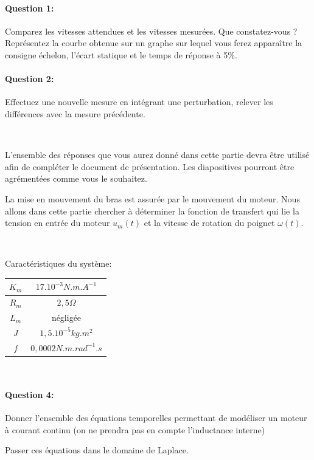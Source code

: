 \paragraph{Question 1:} Comparez les vitesses attendues et les vitesses mesurées. Que constatez-vous ? Représentez la courbe obtenue sur un graphe sur lequel vous ferez apparaître la consigne échelon, l'écart statique et le temps de réponse à 5\%.

\paragraph{Question 2:} Effectuez une nouvelle mesure en intégrant une perturbation, relever les différences avec la mesure précédente.

~\

L'ensemble des réponses que vous aurez donné dans cette partie devra être utilisé afin de compléter le document de présentation. Les diapositives pourront être agrémentées comme vous le souhaitez.

\ifdef{\public}{\cleardoublepage}{\newpage}


La mise en mouvement du bras est assurée par le mouvement du moteur. Nous allons dans cette partie chercher à déterminer la fonction de transfert qui lie la tension en entrée du moteur $u_m(t)$ et la vitesse de rotation du poignet $\omega(t)$.

~\

Caractéristiques du système:
\begin{tabular}{|c|c|}
\hline
$K_m$ & $17.10^{-3}N.m.A^{-1}$ \\
\hline
$R_m$ & $2,5\Omega$ \\
\hline
$L_m$ & négligée \\
\hline
$J$ & $1,5.10^{-5}kg.m^2$ \\
\hline
$f$ & $0,0002N.m.rad^{-1}.s$ \\
\hline\end{tabular}

~\

\paragraph{Question 4:} Donner l'ensemble des équations temporelles permettant de modéliser un moteur à courant continu (on ne prendra pas en compte l'inductance interne)

Passer ces équations dans le domaine de Laplace.

